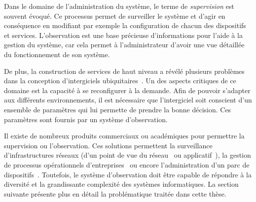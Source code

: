 Dans le domaine de l'administration du système, le terme de \textit{supervision} est souvent évoqué. Ce processus permet de surveiller le système et d'agir en conséquence en modifiant par exemple la configuration de chacun des dispositifs et services. L'observation est une base précieuse d'informations pour l'aide à la gestion du système, car cela permet à l'administrateur d'avoir une vue détaillée du fonctionnement de son système.

De plus, la construction de services de haut niveau a révélé plusieurs problèmes dans la conception d'intergiciels ubiquitaires~\cite{Geihs:challenges}. Un des aspects critiques de ce domaine est la capacité à se reconfigurer à la demande. Afin de pouvoir s'adapter aux différents environnements, il est nécessaire que l'intergiciel soit conscient d'un ensemble de paramètres qui lui permette de prendre la bonne décision. Ces paramètres sont fournis par un système d'observation.

Il existe de nombreux produits commerciaux ou académiques pour permettre la supervision ou l'observation. Ces solutions permettent la surveillance d'infrastructures réseaux (d'un point de vue du réseau~\cite{url:zabbix} ou applicatif~\cite{url:manageengine}), la gestion de processus opérationnels d'entreprises~\cite{url:systar} ou encore l'administration d'un parc de dispositifs~\cite{IETF:SNMP}. Toutefois, le système d'observation doit être capable de répondre à la diversité et la grandissante complexité des systèmes informatiques. La section suivante présente plus en détail la problématique traitée dans cette thèse.
